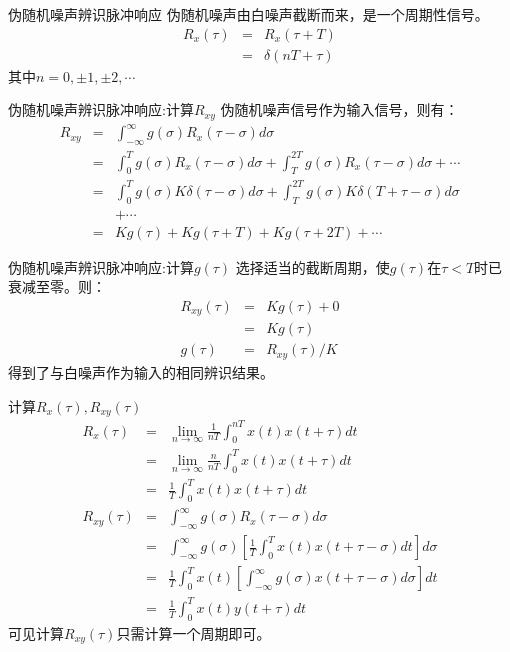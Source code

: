 \begin{frame}{伪随机噪声辨识脉冲响应}
伪随机噪声由白噪声截断而来，是一个周期性信号。
\begin{eqnarray*}
R_x(\tau) &=& R_x(\tau+T) \\
&=& \delta(nT+\tau)
\end{eqnarray*}
其中$n=0,\pm 1,\pm 2,\cdots$
\end{frame}

\begin{frame}{伪随机噪声辨识脉冲响应:计算$R_{xy}$}
伪随机噪声信号作为输入信号，则有：
\begin{eqnarray*}
R_{xy} &=& \int_{-\infty}^{\infty} g(\sigma)R_x(\tau-\sigma)d\sigma \\
&=& \int_{0}^{T}g(\sigma)R_x(\tau-\sigma)d\sigma+\int_{T}^{2T}g(\sigma)R_x(\tau-\sigma)d\sigma +\cdots \\
&=& \int_0^T g(\sigma)K\delta(\tau-\sigma)d\sigma+\int_T^{2T}g(\sigma)K\delta(T+\tau-\sigma)d\sigma \\
&& +\cdots \\
&=& Kg(\tau)+Kg(\tau+T)+Kg(\tau+2T)+\cdots
\end{eqnarray*}
\end{frame}

\begin{frame}{伪随机噪声辨识脉冲响应:计算$g(\tau)$}
选择适当的截断周期，使$g(\tau)$在$\tau<T$时已衰减至零。则：
\begin{eqnarray*}
R_{xy}(\tau)&=& K g(\tau)+0 \\
&=& Kg(\tau) \\
g(\tau)&=& R_{xy}(\tau)/K
\end{eqnarray*}
得到了与白噪声作为输入的相同辨识结果。
\end{frame}

\begin{frame}{计算$R_x(\tau),R_{xy}(\tau)$}
\begin{eqnarray*}
R_x(\tau) &=& \lim_{n \rightarrow \infty}\frac{1}{nT}\int_0^{nT}x(t)x(t+\tau)dt \\
&=&\lim_{n\rightarrow \infty}\frac{n}{nT}\int_0^{T}x(t)x(t+\tau)dt \\
&=&\frac{1}{T}\int_0^{T}x(t)x(t+\tau)dt \\
R_{xy}(\tau) &=& \int_{-\infty}^{\infty}g(\sigma)R_x(\tau-\sigma)d\sigma \\
&=& \int_{-\infty}^{\infty}g(\sigma)\left[\frac{1}{T}\int_0^Tx(t)x(t+\tau-\sigma)dt\right]d\sigma \\
&=& \frac{1}{T}\int_0^T x(t)\left[\int_{-\infty}^{\infty}g(\sigma)x(t+\tau-\sigma)d\sigma\right]dt \\
&=& \frac{1}{T}\int_0^T x(t)y(t+\tau)dt
\end{eqnarray*}
可见计算$R_{xy}(\tau)$只需计算一个周期即可。
\end{frame}

